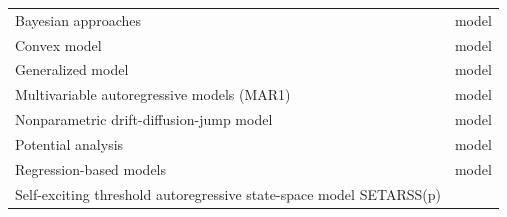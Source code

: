 \documentclass[12pt,twoside,openany]{reedthesis}
\begin{document}
\begin{longtable}[]{@{}lc@{}}
\begin{minipage}[t]{0.31\columnwidth}\raggedright
Bayesian
approaches\strut
\end{minipage} & \begin{minipage}[t]{0.35\columnwidth}\centering
model\strut
\end{minipage}\tabularnewline
\begin{minipage}[t]{0.31\columnwidth}\raggedright
Convex model\strut
\end{minipage} & \begin{minipage}[t]{0.35\columnwidth}\centering
model\strut
\end{minipage}\tabularnewline
\begin{minipage}[t]{0.31\columnwidth}\raggedright
Generalized
model\strut
\end{minipage} & \begin{minipage}[t]{0.35\columnwidth}\centering
model\strut
\end{minipage}\tabularnewline
\begin{minipage}[t]{0.31\columnwidth}\raggedright
Multivariable
autoregressive
models (MAR1)\strut
\end{minipage} & \begin{minipage}[t]{0.35\columnwidth}\centering
model\strut
\end{minipage}\tabularnewline
\begin{minipage}[t]{0.31\columnwidth}\raggedright
Nonparametric
drift-diffusion-jump
model\strut
\end{minipage} & \begin{minipage}[t]{0.35\columnwidth}\centering
model\strut
\end{minipage}\tabularnewline
\begin{minipage}[t]{0.31\columnwidth}\raggedright
Potential
analysis\strut
\end{minipage} & \begin{minipage}[t]{0.35\columnwidth}\centering
model\strut
\end{minipage}\tabularnewline
\begin{minipage}[t]{0.31\columnwidth}\raggedright
Regression-based
models\strut
\end{minipage} & \begin{minipage}[t]{0.35\columnwidth}\centering
model\strut
\end{minipage}\tabularnewline
\begin{minipage}[t]{0.31\columnwidth}\raggedright
Self-exciting
threshold
autoregressive
state-space
model SETARSS(p)\strut

\end{minipage}
\end{longtable}
\end{document}
